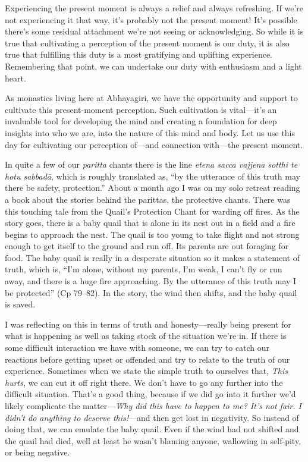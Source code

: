 Experiencing the present moment is always a relief and always 
refreshing. If we're not experiencing it that way, it's probably not 
the present moment! It's possible there's some residual attachment 
we're not seeing or acknowledging. So while it is true that cultivating 
a perception of the present moment is our duty, it is also true that 
fulfilling this duty is a most gratifying and uplifting experience. 
Remembering that point, we can undertake our duty with enthusiasm and a 
light heart.

As monastics living here at Abhayagiri, we have the opportunity and 
support to cultivate this present-moment perception. Such cultivation 
is vital---it's an invaluable tool for developing the mind and creating 
a foundation for deep insights into who we are, into the nature of this 
mind and body. Let us use this day for cultivating our perception 
of---and connection with---the present moment.


In quite a few of our \emph{paritta} chants there is the line 
\emph{etena sacca vajjena sotthi te hotu sabbadā}, which is roughly 
translated as, ``by the utterance of this truth may there be safety, 
protection.'' About a month ago I was on my solo retreat reading a book 
about the stories behind the parittas, the protective chants. There was 
this touching tale from the Quail's Protection Chant for warding off 
fires. As the story goes, there is a baby quail that is alone in its 
nest out in a field and a fire begins to approach the nest. The quail 
is too young to take flight and not strong enough to get itself to the 
ground and run off. Its parents are out foraging for food. The baby 
quail is really in a desperate situation so it makes a statement of 
truth, which is, ``I'm alone, without my parents, I'm weak, I can't fly 
or run away, and there is a huge fire approaching. By the utterance of 
this truth may I be protected'' (Cp 79–82). In the story, the wind 
then shifts, and the baby quail is saved.

I was reflecting on this in terms of truth and honesty---really being 
present for what is happening as well as taking stock of the situation 
we're in. If there is some difficult interaction we have with someone, 
we can try to catch our reactions before getting upset or offended and 
try to relate to the truth of our experience. Sometimes when we state 
the simple truth to ourselves that, \emph{This hurts}, we can cut it 
off right there. We don't have to go any further into the difficult 
situation. That's a good thing, because if we did go into it further 
we'd likely complicate the matter---\emph{Why did this have to happen 
to me? It's not fair. I didn't do anything to deserve this!}---and then 
get lost in negativity. So instead of doing that, we can emulate the 
baby quail. Even if the wind had not shifted and the quail had died, 
well at least he wasn't blaming anyone, wallowing in self-pity, or 
being negative.

